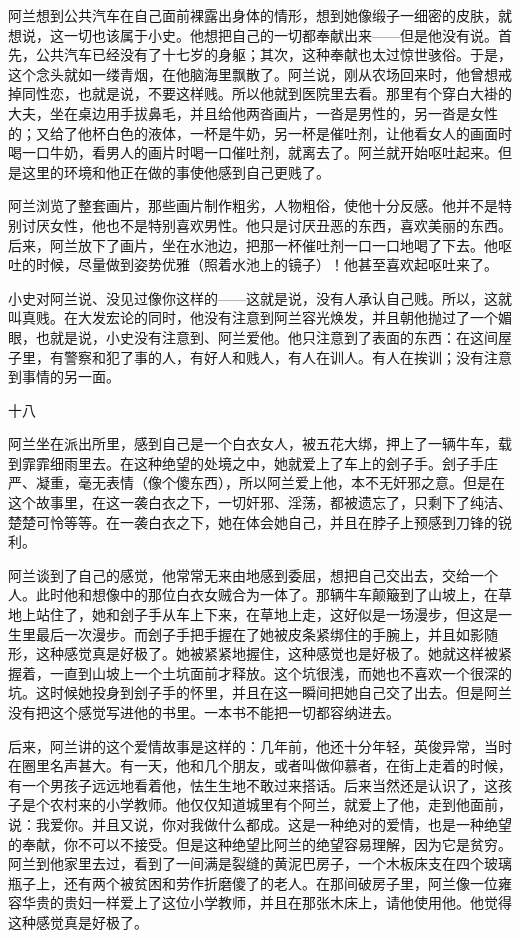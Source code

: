 阿兰想到公共汽车在自己面前裸露出身体的情形，想到她像缎子一细密的皮肤，就想说，这一切也该属于小史。他想把自己的一切都奉献出来——但是他没有说。首先，公共汽车已经没有了十七岁的身躯；其次，这种奉献也太过惊世骇俗。于是，这个念头就如一缕青烟，在他脑海里飘散了。阿兰说，刚从农场回来时，他曾想戒掉同性恋，也就是说，不要这样贱。所以他就到医院里去看。那里有个穿白大褂的大夫，坐在桌边用手拔鼻毛，并且给他两沓画片，一沓是男性的，另一沓是女性的；又给了他杯白色的液体，一杯是牛奶，另一杯是催吐剂，让他看女人的画面时喝一口牛奶，看男人的画片时喝一口催吐剂，就离去了。阿兰就开始呕吐起来。但是这里的环境和他正在做的事使他感到自己更贱了。 

阿兰浏览了整套画片，那些画片制作粗劣，人物粗俗，使他十分反感。他并不是特别讨厌女性，他也不是特别喜欢男性。他只是讨厌丑恶的东西，喜欢美丽的东西。后来，阿兰放下了画片，坐在水池边，把那一杯催吐剂一口一口地喝了下去。他呕吐的时候，尽量做到姿势优雅（照着水池上的镜子）！他甚至喜欢起呕吐来了。 

小史对阿兰说、没见过像你这样的——这就是说，没有人承认自己贱。所以，这就叫真贱。在大发宏论的同时，他没有注意到阿兰容光焕发，并且朝他抛过了一个媚眼，也就是说，小史没有注意到、阿兰爱他。他只注意到了表面的东西：在这间屋子里，有警察和犯了事的人，有好人和贱人，有人在训人。有人在挨训；没有注意到事情的另一面。 

十八 

阿兰坐在派出所里，感到自己是一个白衣女人，被五花大绑，押上了一辆牛车，载到霏霏细雨里去。在这种绝望的处境之中，她就爱上了车上的刽子手。刽子手庄严、凝重，毫无表情（像个傻东西），所以阿兰爱上他，本不无奸邪之意。但是在这个故事里，在这一袭白衣之下，一切奸邪、淫荡，都被遗忘了，只剩下了纯洁、楚楚可怜等等。在一袭白衣之下，她在体会她自己，并且在脖子上预感到刀锋的锐利。 

阿兰谈到了自己的感觉，他常常无来由地感到委屈，想把自己交出去，交给一个人。此时他和想像中的那位白衣女贼合为一体了。那辆牛车颠簸到了山坡上，在草地上站住了，她和刽子手从车上下来，在草地上走，这好似是一场漫步，但这是一生里最后一次漫步。而刽子手把手握在了她被皮条紧绑住的手腕上，并且如影随形，这种感觉真是好极了。她被紧紧地握住，这种感觉也是好极了。她就这样被紧握着，一直到山坡上一个土坑面前才释放。这个坑很浅，而她也不喜欢一个很深的坑。这时候她投身到刽子手的怀里，并且在这一瞬间把她自己交了出去。但是阿兰没有把这个感觉写进他的书里。一本书不能把一切都容纳进去。 

后来，阿兰讲的这个爱情故事是这样的：几年前，他还十分年轻，英俊异常，当时在圈里名声甚大。有一天，他和几个朋友，或者叫做仰慕者，在街上走着的时候，有一个男孩子远远地看着他，怯生生地不敢过来搭话。后来当然还是认识了，这孩子是个农村来的小学教师。他仅仅知道城里有个阿兰，就爱上了他，走到他面前，说：我爱你。并且又说，你对我做什么都成。这是一种绝对的爱情，也是一种绝望的奉献，你不可以不接受。但是这种绝望比阿兰的绝望容易理解，因为它是贫穷。阿兰到他家里去过，看到了一间满是裂缝的黄泥巴房子，一个木板床支在四个玻璃瓶子上，还有两个被贫困和劳作折磨傻了的老人。在那间破房子里，阿兰像一位雍容华贵的贵妇一样爱上了这位小学教师，并且在那张木床上，请他使用他。他觉得这种感觉真是好极了。 

